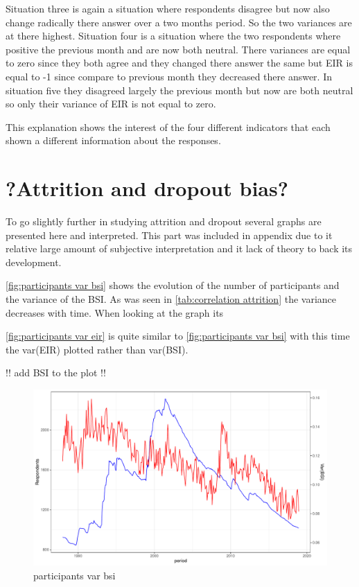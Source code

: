 \documentclass[12pt,a4paper,oneside]{book}
\begin{document}
Situation three is again a situation where respondents disagree but now also change radically there answer over a two months period. So the two variances are at there highest.
Situation four is a situation where the two respondents where positive the previous month and are now both neutral. There variances are equal to zero since they both agree and they changed there answer the same but EIR is equal to -1 since compare to previous month they decreased there answer.
In situation five they disagreed largely the previous month but now are both neutral so only their variance of EIR is not equal to zero.

This explanation shows the interest of the four different indicators that each shown a different information about the responses.


\section*{?Attrition and dropout bias?}

To go slightly further in studying attrition and dropout several graphs are presented here and interpreted. 
This part was included in appendix due to it relative large amount of subjective interpretation and it lack of theory to back its development.

\autoref{fig:participants var bsi} shows the evolution of the number of participants and the variance of the BSI. As was seen in \autoref{tab:correlation attrition} the variance decreases with time. When looking at the graph its



\autoref{fig:participants var eir} is quite similar to \autoref{fig:participants var bsi} with this time the var(EIR) plotted rather than var(BSI).


!!
add BSI to the plot
!!


\begin{figure}[htp!]
    \centering
    \includegraphics[scale=0.5]{Graphs/participants_var_bsi.pdf}
    \caption{participants var bsi}
    \label{fig:participants var bsi}
\end{figure}
\end{document}
